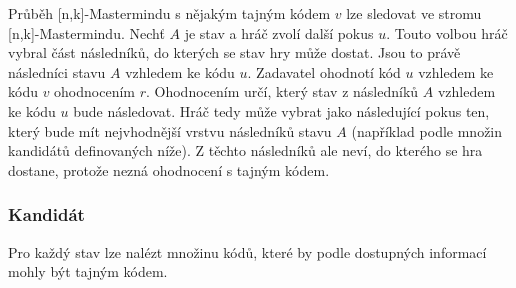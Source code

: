 Průběh [n,k]-Mastermindu s nějakým tajným kódem $v$ lze sledovat ve stromu [n,k]-Mastermindu. Nechť $A$ je stav a hráč zvolí další pokus $u$. Touto volbou hráč vybral část následníků, do kterých se stav hry může dostat. Jsou to právě následníci stavu $A$ vzhledem ke kódu $u$. Zadavatel ohodnotí kód $u$ vzhledem ke kódu $v$ ohodnocením $r$. Ohodnocením určí, který stav z následníků $A$ vzhledem ke kódu $u$ bude následovat. Hráč tedy může vybrat jako následující pokus ten, který bude mít nejvhodnější vrstvu následníků stavu $A$ (například podle množin kandidátů definovaných níže). Z těchto následníků ale neví, do kterého se hra dostane, protože nezná ohodnocení s tajným kódem. 


\subsubsection{Kandidát}
Pro každý stav lze nalézt množinu kódů, které by podle dostupných informací mohly být tajným kódem. 

